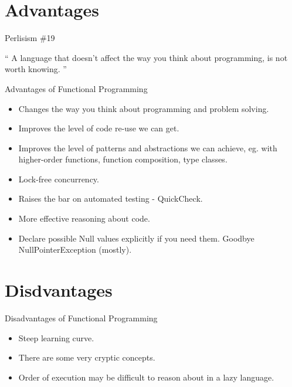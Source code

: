 \documentclass[mathserif]{beamer}
\begin{document}
\section{Advantages}

\begin{frame}{Perlisism \#19}

\begin{exampleblock}{}
  {\Large ``
    A language that doesn't affect the way you think about programming, is not worth knowing.
  ''}
  \vskip5mm
  \hspace*{}
\end{exampleblock}

\end{frame}

\begin{frame}{Advantages of Functional Programming}

  \begin{itemize}[<+->]
  \item Changes the way you think about programming and problem solving.
  \item Improves the level of code re-use we can get.
  \item Improves the level of patterns and abstractions we can achieve, eg.
    with higher-order functions, function composition, type classes.
  \item Lock-free concurrency.
  \item Raises the bar on automated testing - QuickCheck.
  \item More effective reasoning about code.
  \item Declare possible Null values explicitly if you need them.
    Goodbye NullPointerException (mostly).
  \end{itemize}

\end{frame}

\section{Disdvantages}

\begin{frame}{Disadvantages of Functional Programming}

  \begin{itemize}[<+->]
  \item Steep learning curve.
  \item There are some very cryptic concepts.
  \item Order of execution may be difficult to reason about in a lazy language.
  \end{itemize}

\end{frame}
\end{document}
